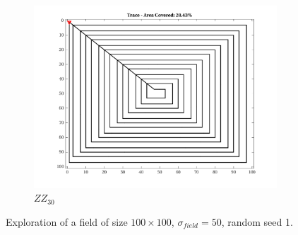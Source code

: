 \begin{figure}[htb!]
    \begin{subfigure}[t]{0.25\textwidth}
        \centering
        \includegraphics[width=\linewidth]{figures/path_zz_30p_100x100_sf_50_seed_1.png}
        \captionsetup{skip=0.20\baselineskip,size=footnotesize}
        \caption{$ZZ_{30}$}
    \end{subfigure}%
    \captionsetup{skip=0.20\baselineskip}
    \caption{Exploration of a field of size $100 \times 100$, $\sigma_{field} = 50$, random seed 1.}
    \label{fig:sf50}
\end{figure}

